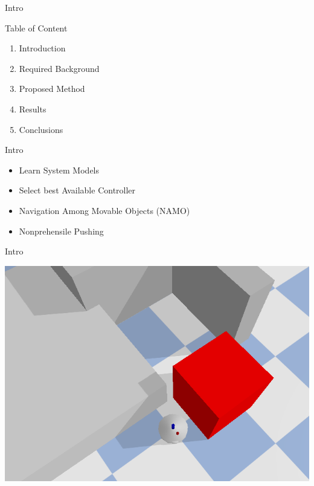 \begin{frame}[c]{Intro} 
  \begin{block}{Table of Content}
    \begin{enumerate}
      \item Introduction
      \item Required Background
      \item Proposed Method
      \item Results
      \item Conclusions
    \end{enumerate}
  \end{block}
\end{frame}

\begin{frame}[fragile]{Intro} 
\begin{block}{}
\begin{itemize}
  \item Learn System Models\\
  \item Select best Available Controller
\end{itemize}
  \end{block}\pause

\begin{block}{}
\begin{itemize}
  \item Navigation Among Movable Objects (NAMO)\\
  \item Nonprehensile Pushing
\end{itemize}
  \end{block}
\end{frame}





\begin{frame}[fragile]{Intro}
\vspace{-0.7cm}
\begin{center}
\includegraphics[height=0.9\textheight]{figures/introduction/robot_no_target}
\end{center}
\end{frame}


